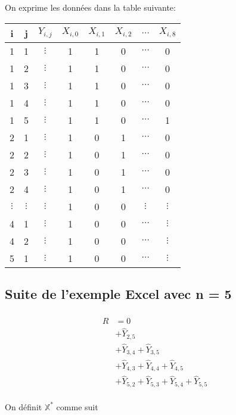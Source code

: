 \newpage
On exprime les données dans la table suivante:

\begin{center}
\begin{tabular}{|c|c|c|c|c|c|c|c|}
  \hline
   i & j & $Y_{i,j}$ & $X_{i,0}$  & $X_{i,1}$ & $X_{i,2}$ & $\ldots$ & $X_{i,8}$\\
  \hline
  1 & 1 & $\vdots$ & 1 & 1 & 0 & $\cdots$ & 0\\
  1 & 2 & $\vdots$ & 1 & 1 & 0 & $\cdots$ & 0\\
  1 & 3 & $\vdots$ & 1 & 1 & 0 & $\cdots$ & 0\\
  1 & 4 & $\vdots$ & 1 & 1 & 0 & $\cdots$ & 0\\
  1 & 5 & $\vdots$ & 1 & 1 & 0 & $\cdots$ & 1\\
  2 & 1 & $\vdots$ & 1 & 0 & 1 & $\cdots$ & 0\\
  2 & 2 & $\vdots$ & 1 & 0 & 1 & $\cdots$ & 0\\
  2 & 3 & $\vdots$ & 1 & 0 & 1 & $\cdots$ & 0\\
  2 & 4 & $\vdots$ & 1 & 0 & 1 & $\cdots$ & 0\\
  $\vdots$ & $\vdots$ & $\vdots$ & 1 & 0 & 0 & $\vdots$ & $\vdots$ \\
  4 & 1 & $\vdots$ & 1 & 0 & 0 & $\cdots$ & $\vdots$ \\
  4 & 2 & $\vdots$ & 1 & 0 & 0 & $\cdots$ & $\vdots$ \\
  5 & 1 & $\vdots$ & 1 & 0 & 0 & $\cdots$ & $\vdots$ \\
  \hline
\end{tabular}

\end{center}
\subsection*{Suite de l'exemple Excel avec n = 5}
\begin{align*}
\widehat{R} &= 0 \\
&+ \widehat{Y}_{2,5} \\
&+ \widehat{Y}_{3,4} + \widehat{Y}_{3,5} \\
&+ \widehat{Y}_{4,3} + \widehat{Y}_{4,4} + \widehat{Y}_{4,5} \\
&+ \widehat{Y}_{5,2} + \widehat{Y}_{5,3} + \widehat{Y}_{5,4} +  \widehat{Y}_{5,5}\\
\end{align*}

\newpage

On définit $\mathbb{X}^*$ comme suit

